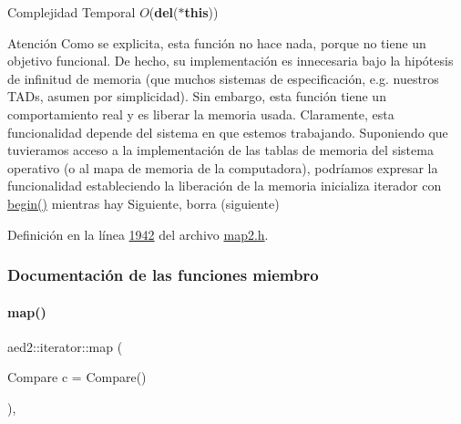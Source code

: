 \begin{DoxyDescription}
\item[Complejidad Temporal]$O$({\bfseries del}({\bfseries $\ast$this}))
\end{DoxyDescription}

\begin{DoxyAttention}{Atención}
Como se explicita, esta función no hace nada, porque no tiene un objetivo funcional. De hecho, su implementación es innecesaria bajo la hipótesis de infinitud de memoria (que muchos sistemas de especificación, e.\+g. nuestros T\+A\+Ds, asumen por simplicidad). Sin embargo, esta función tiene un comportamiento real y es liberar la memoria usada. Claramente, esta funcionalidad depende del sistema en que estemos trabajando. Suponiendo que tuvieramos acceso a la implementación de las tablas de memoria del sistema operativo (o al mapa de memoria de la computadora), podríamos expresar la funcionalidad estableciendo la liberación de la memoria inicializa iterador con \hyperlink{classaed2_1_1iterator_af8901de173468531c58458b581d345a6_af8901de173468531c58458b581d345a6}{begin()} mientras hay Siguiente, borra (siguiente) 
\end{DoxyAttention}


Definición en la línea \hyperlink{map2_8h_source_l01942}{1942} del archivo \hyperlink{map2_8h_source}{map2.\+h}.



\subsubsection{Documentación de las funciones miembro}
\mbox{\label{classaed2_1_1iterator_ab55f7bc4639e905d66935b56995a5b1f_ab55f7bc4639e905d66935b56995a5b1f}} 
\paragraph{\texorpdfstring{map()}{map()}\hspace{0.1cm}{\footnotesize\ttfamily [1/3]}}
{\footnotesize\ttfamily aed2\+::iterator\+::map (\begin{DoxyParamCaption}\item[{Compare}]{c = {\ttfamily Compare()} }\end{DoxyParamCaption})\hspace{0.3cm}{\ttfamily [inline]}, {\ttfamily [explicit]}}



